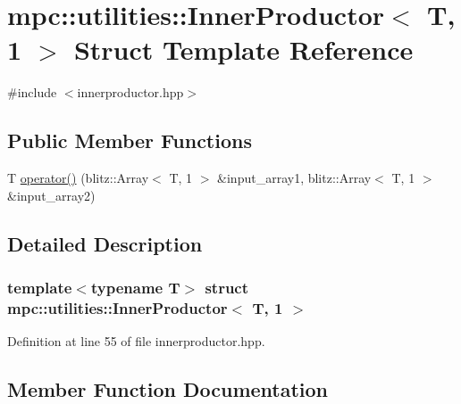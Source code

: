 \hypertarget{structmpc_1_1utilities_1_1_inner_productor_3_01_t_00_011_01_4}{}\section{mpc\+:\+:utilities\+:\+:Inner\+Productor$<$ T, 1 $>$ Struct Template Reference}
\label{structmpc_1_1utilities_1_1_inner_productor_3_01_t_00_011_01_4}


{\ttfamily \#include $<$innerproductor.\+hpp$>$}

\subsection*{Public Member Functions}
\begin{DoxyCompactItemize}
\item 
T \mbox{\hyperlink{structmpc_1_1utilities_1_1_inner_productor_3_01_t_00_011_01_4_aa16d2ebcd71729fdf35c40a6fb5fa422}{operator()}} (blitz\+::\+Array$<$ T, 1 $>$ \&input\+\_\+array1, blitz\+::\+Array$<$ T, 1 $>$ \&input\+\_\+array2)
\end{DoxyCompactItemize}


\subsection{Detailed Description}
\subsubsection*{template$<$typename T$>$\newline
struct mpc\+::utilities\+::\+Inner\+Productor$<$ T, 1 $>$}



Definition at line 55 of file innerproductor.\+hpp.



\subsection{Member Function Documentation}
\mbox{\label{structmpc_1_1utilities_1_1_inner_productor_3_01_t_00_011_01_4_aa16d2ebcd71729fdf35c40a6fb5fa422}} 
